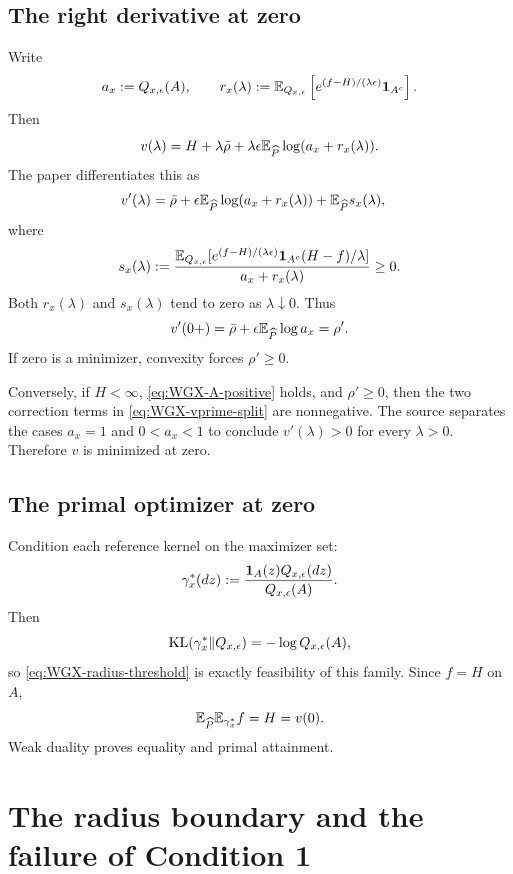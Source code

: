 \subsection{The right derivative at zero}
Write
\[
 a_x:=Q_{x,\epsilon}(A),
 \qquad
 r_x(\lambda)
 :=\mathbb{E}_{Q_{x,\epsilon}}
 \left[e^{(f-H)/(\lambda\epsilon)}\mathbf{1}_{A^c}\right].
\]
Then
\begin{equation}\label{eq:WGX-v-split}
 v(\lambda)
 =H+\lambda\bar\rho
 +\lambda\epsilon\mathbb{E}_{\widehat P}\log(a_x+r_x(\lambda)).
\end{equation}
The paper differentiates this as
\begin{align}
 v'(\lambda)
 &=\bar\rho
 +\epsilon\mathbb{E}_{\widehat P}\log(a_x+r_x(\lambda))
 +\mathbb{E}_{\widehat P}s_x(\lambda),\label{eq:WGX-vprime-split}
\end{align}
where
\begin{equation}\label{eq:WGX-sx}
 s_x(\lambda)
 :=\frac{
 \mathbb{E}_{Q_{x,\epsilon}}
 [e^{(f-H)/(\lambda\epsilon)}\mathbf{1}_{A^c}(H-f)/\lambda]
 }{a_x+r_x(\lambda)}\ge0.
\end{equation}
Both $r_x(\lambda)$ and $s_x(\lambda)$ tend to zero as $\lambda\downarrow0$.  Thus
\begin{equation}\label{eq:WGX-vprime-zero}
 v'(0+)=\bar\rho+
 \epsilon\mathbb{E}_{\widehat P}\log a_x=\rho'.
\end{equation}
If zero is a minimizer, convexity forces $\rho'\ge0$.

Conversely, if $H<\infty$, \eqref{eq:WGX-A-positive} holds, and $\rho'\ge0$, then the two correction terms in \eqref{eq:WGX-vprime-split} are nonnegative.  The source separates the cases $a_x=1$ and $0<a_x<1$ to conclude $v'(\lambda)>0$ for every $\lambda>0$.  Therefore $v$ is minimized at zero.

\subsection{The primal optimizer at zero}
Condition each reference kernel on the maximizer set:
\begin{equation}\label{eq:WGX-zero-kernel}
 \gamma_x^*(dz)
 :=\frac{\mathbf{1}_A(z)Q_{x,\epsilon}(dz)}{Q_{x,\epsilon}(A)}.
\end{equation}
Then
\[
 \mathrm{KL}(\gamma_x^*\|Q_{x,\epsilon})
 =-\log Q_{x,\epsilon}(A),
\]
so \eqref{eq:WGX-radius-threshold} is exactly feasibility of this family.  Since $f=H$ on $A$,
\[
 \mathbb{E}_{\widehat P}\mathbb{E}_{\gamma_x^*}f=H=v(0).
\]
Weak duality proves equality and primal attainment.

\section{The radius boundary and the failure of Condition 1}

